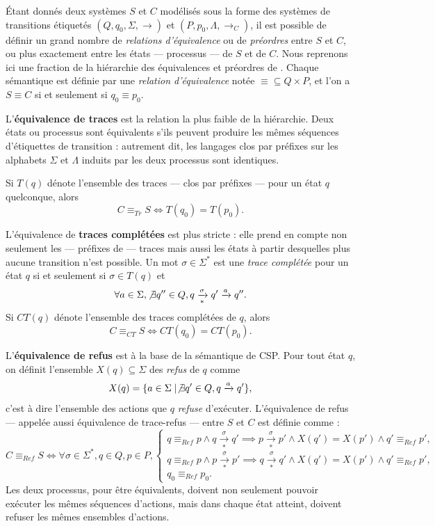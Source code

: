 \'Etant donn\'es deux syst\`emes $S$ et $C$ mod\'elis\'es sous la
forme des syst\`emes de transitions \'etiquet\'es
$(Q,q_0,\Sigma,\rightarrow)$  et $(P,p_0,\Lambda,\rightarrow_C)$, il
est possible de d\'efinir un grand nombre de \emph{relations
d'\'equivalence} ou de \emph{pr\'eordres} entre $S$ et $C$, ou plus
exactement entre les \'etats --- processus ---  de $S$ et de
$C$. Nous reprenons ici une fraction de la hi\'erarchie des
\'equivalences et pr\'eordres de \cite{sem-seq-proc}. Chaque
s\'emantique est d\'efinie par une \emph{relation d'\'equivalence}
not\'ee $\equiv\subseteq Q  \times{}P$, et l'on a $S\equiv C$ si et
seulement si $q_0 \equiv p_0$. 

L'\textbf{\'equivalence de traces} est la relation la plus faible de
la hi\'erarchie. Deux \'etats ou processus sont \'equivalents s'ils
peuvent produire les m\^emes s\'equences d'\'etiquettes de
transition : autrement dit, les langages clos par pr\'efixes sur les alphabets $\Sigma$ et
$\Lambda$ induits par les deux processus  sont identiques.

Si $T(q)$ d\'enote l'ensemble des traces --- clos par pr\'efixes ---
pour un \'etat $q$ quelconque, alors 
$$
C \equiv_{Tr} S \Leftrightarrow T(q_0) = T(p_0).
$$

L'\'equivalence de \textbf{traces compl\'et\'ees} est plus stricte
: elle prend en compte non seulement les --- pr\'efixes de --- traces
mais aussi les \'etats \`a partir desquelles plus aucune transition
n'est possible. Un mot $\sigma\in\Sigma^*$ est une \emph{trace compl\'et\'ee} pour un
\'etat $q$ si et seulement si $\sigma \in T(q)$ et 
$$
\forall a
\in \Sigma, \not\exists q'' \in Q,  q\xrightarrow[*]{\sigma} q'\xrightarrow{a} q''.
$$
Si $CT(q)$ d\'enote l'ensemble des traces compl\'et\'ees de $q$,
alors 
$$
C \equiv_{CT} S \Leftrightarrow CT(q_0) = CT(p_0).
$$


L'\textbf{\'equivalence de refus} est \`a
la base de la s\'emantique de \textsf{CSP}. 
Pour tout \'etat $q$, on d\'efinit l'ensemble $X(q)\subseteq \Sigma$ des \emph{refus}
de $q$ comme
$$
X(q) = \{ a\in \Sigma \mid \not\exists q'\in Q, q\xrightarrow{a}q'\},
$$
c'est \`a dire l'ensemble des actions que $q$ \emph{refuse} d'ex\'ecuter.
L'\'equivalence de refus --- appel\'ee aussi \'equivalence de
trace-refus --- entre $S$ et $C$ est d\'efinie comme :
$$
C \equiv_{Ref} S \Leftrightarrow 
\forall \sigma \in \Sigma^*,q \in Q, p\in P,\left\{
\begin{array}{lcl}
    q \equiv_{Ref} p \wedge q \xrightarrow[*]{\sigma} q' \implies p
    \xrightarrow[*]{\sigma} p' \wedge X(q') = X(p') \wedge q' \equiv_{Ref} p', \\
    q \equiv_{Ref} p \wedge p \xrightarrow[*]{\sigma} p' \implies q
    \xrightarrow[*]{\sigma} q' \wedge X(q') = X(p')\wedge q'\equiv_{Ref} p',
    \\
    q_0 \equiv_{Ref} p_0.
\end{array}\right.
$$
Les deux processus, pour \^etre \'equivalents, doivent non seulement 
pouvoir ex\'ecuter les m\^emes s\'equences d'actions, mais dans
chaque \'etat atteint, doivent refuser les m\^emes ensembles 
d'actions.  

